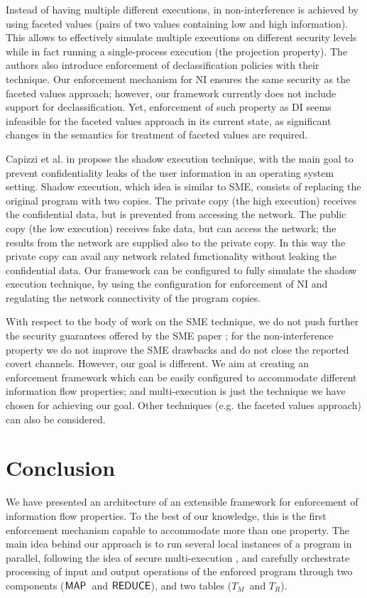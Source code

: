 \documentclass[10pt,a4paper,oneside]{article}
\def\TAV{\ensuremath{T_{M}}}
\def\TPV{\ensuremath{T_{R}}}
\def\sanserif#1{\ensuremath{\sf #1}}
\def\REDUCE{\ensuremath{\sanserif{REDUCE}}}
\def\MAP{\ensuremath{\sanserif{MAP}}}
\begin{document}
Instead of having multiple different executions, in \cite{Aust-Flan-12-POPL} non-interference is achieved by using faceted values (pairs of two values containing low and high information). This allows to effectively simulate multiple executions on different security levels while in fact running a single-process execution (the projection property).   The authors also introduce enforcement of declassification policies with their technique. Our enforcement mechanism for NI ensures the same security as the faceted values approach; however, our framework currently does not include support for declassification. Yet, enforcement of such property as DI seems infeasible for the faceted values approach in its current state, as significant changes in the semantics for treatment of faceted values are required. 

Capizzi et al. in \cite{Capi-Long-Venk-08-ACSAC} propose the shadow execution technique, with the main goal to prevent confidentiality leaks of the user information in an operating system setting. Shadow execution, which idea is similar to SME, consists of replacing the original program with two copies. The private copy (the high execution) receives the confidential data, but is prevented from accessing the network. The public copy (the low execution) receives fake data, but can access the network; the results from the network are supplied also to the private copy. In this way the private copy can avail any network related functionality without leaking the confidential data. Our framework can be configured to fully simulate the shadow execution technique, by using the configuration for enforcement of NI and regulating the network connectivity of the program copies.

With respect to the body of work on the SME technique, we do not push further the security guarantees offered by the SME paper \cite{Devr-Pies-10-IEEESP}; for the non-interference property we do not improve the SME drawbacks and do not close the reported covert channels. However, our goal is different. We aim at creating an enforcement framework which can be easily configured to accommodate different information flow properties; and multi-execution is just the technique we have chosen for achieving our goal. Other techniques (e.g. the faceted values approach) can also be considered.








\section{Conclusion}\label{sec:conclusion}
We have presented an architecture of an extensible framework for enforcement of information flow properties. To the best of our knowledge, this is the first enforcement mechanism capable to accommodate more than one property. The main idea behind our approach is to run several local instances of a program in parallel, following the idea of secure multi-execution \cite{Devr-Pies-10-IEEESP}, and carefully orchestrate processing of input and output operations of the enforced program through two components (\MAP\ and \REDUCE), and two tables (\TAV\ and \TPV).
\end{document}
